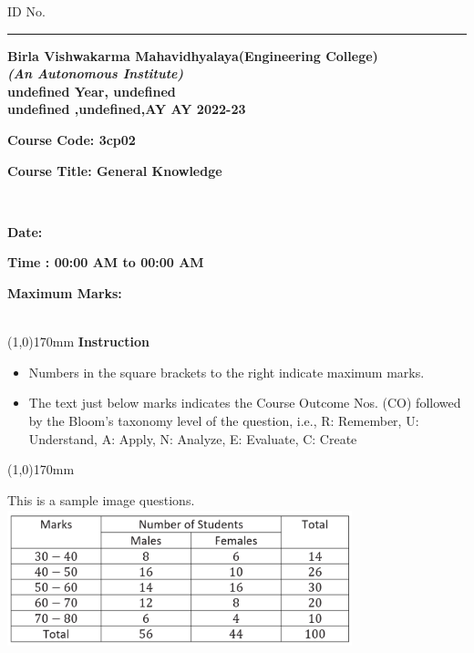 \documentclass[addpoints,12pt]{exam}
\begin{document}
      \hspace{-7mm}ID No.\rule{20mm}{0.3mm}
      \begin{center}
   \textbf{Birla Vishwakarma Mahavidhyalaya(Engineering College)} \\
    \textbf{\textit{(An Autonomous Institute)}} \\
    \textbf{undefined Year, undefined} \\
    \textbf{undefined ,undefined,AY AY 2022-23} \\
    \vspace{4mm}
   
   
    \end{center}
   
    \hspace{-7mm}
    \parbox[t]{50mm}{\textbf{Course Code: 3cp02}}
    \parbox[t]{100mm}{\textbf{Course Title: General Knowledge}}\vspace{2mm}\\
    \parbox[t]{50mm}{\textbf{Date: }}
    \parbox[t]{75mm}{\textbf{Time : 00:00 AM to 00:00 AM}}
    \parbox[t]{50mm}{\textbf{Maximum Marks: }}\\
    \line(1,0){170mm} \vspace{2mm}
    \hspace{-6mm}\textbf{Instruction}
  
   
  
    \begin{itemize}[leftmargin=4mm,rightmargin=-2cm]
        \item Numbers in the square brackets to the right indicate maximum marks.
       
        \item The text just below marks indicates the Course Outcome Nos. (CO) followed by the Bloom’s taxonomy level of the question, i.e., R: Remember, U: Understand, A: Apply, N: Analyze, E: Evaluate, C: Create
    \end{itemize}
    \line(1,0){170mm}
   \vspace{5mm}
\begin{questions}
\pointname{}
\pointsinrightmargin
{}\question[3] T\vspace{-\baselineskip}\vspace{1mm}his is a sample image questions.\\
\includegraphics[width=10cm,height=4cm]{158.png}
 \vspace{2mm} 

 \end{questions}
\end{document}
